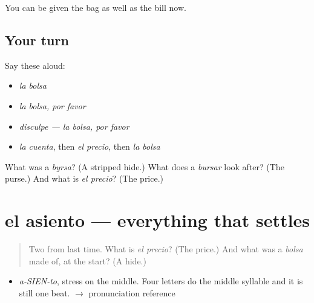 \begin{grammarlens}[title={What you've built}]
You can be given the bag as well as the bill now.
\end{grammarlens}

\subsection*{Your turn}
Say these aloud:

\begin{itemize}
\raggedright
  \item \emph{la bolsa}
  \item \emph{la bolsa, por favor}
  \item \emph{disculpe — la bolsa, por favor}
  \item \emph{la cuenta}, then \emph{el precio}, then \emph{la bolsa}
\end{itemize}

\begin{tcolorbox}[breakable,colback=teal!4,colframe=teal!35!black,title={Before you move on}]
What was a \emph{byrsa}? (A stripped hide.) What does a \emph{bursar} look after? (The purse.) And what is \emph{el precio}? (The price.)
\end{tcolorbox}
\section[el asiento]{el asiento — everything that settles}

\label{lesson:ES-C311-asiento}



\begin{quote}
Two from last time. What is \emph{el precio}? (The price.) And what was a \emph{bolsa} made of, at the start? (A hide.)
\end{quote}

\begin{sounds}
\begin{itemize}
\raggedright
  \item \emph{a-SIEN-to}, stress on the middle. Four letters do the middle syllable and it is still one beat. $\to$ pronunciation reference
\end{itemize}
\end{sounds}

